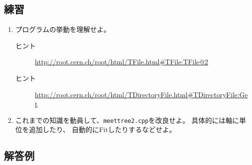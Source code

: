   \subsection{練習}
  \begin{enumerate}
   \item プログラムの挙動を理解せよ。
	 \begin{description}
	  \item[ヒント] \url{http://root.cern.ch/root/html/TFile.html#TFile:TFile@2}
	  \item[ヒント] \url{http://root.cern.ch/root/html/TDirectoryFile.html#TDirectoryFile:Get}
	 \end{description}
   \item これまでの知識を動員して、\verb|meettree2.cpp|を改良せよ。
	 具体的には軸に単位を追加したり、
	 自動的にFitしたりするなどせよ。
  \end{enumerate}

  \subsection{解答例}
